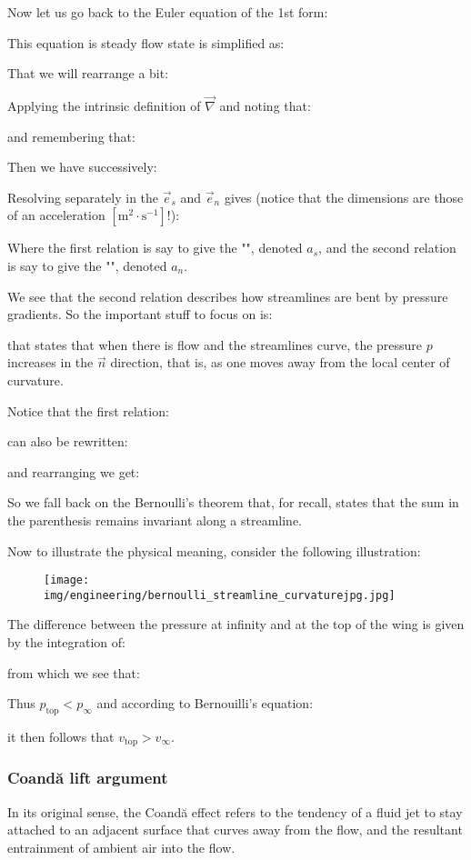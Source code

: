 	Now let us go back to the Euler equation of the 1st form:
	
	This equation is steady flow state is simplified as:
	
	That we will rearrange a bit:
	
	Applying the intrinsic definition of $\vec{\nabla}$ and noting that:
	
	and remembering that:
	
	Then we have successively:
	
	Resolving separately in the $\vec{e}_s$ and $\vec{e}_n$ gives (notice that the dimensions are those of an acceleration $[\text{m}^2\cdot \text{s}^{-1}]$!):
	
	Where the first relation is say to give the "", denoted $a_s$, and the second relation is say to give the "", denoted $a_n$.
	
	We see that the second relation describes how streamlines are bent by pressure gradients. So the important stuff to focus on is:
	
 	that states that when there is flow and the streamlines curve,
the pressure $p$  increases in the $\vec{n}$ direction, that is, as one moves away from the local center of curvature.
	\begin{tcolorbox}[title=Remark,colframe=black,arc=10pt]
	Notice that the first relation:
	
	can also be rewritten:
	
	and rearranging we get:
	
	So we fall back on the Bernoulli's theorem that, for recall, states that the sum in the parenthesis remains invariant along a streamline.
	\end{tcolorbox}
	Now to illustrate the physical meaning, consider the following illustration:
	\begin{figure}[H]
		\centering
		\texttt{[image: img/engineering/bernoulli\_streamline\_curvaturejpg.jpg]}
	\end{figure}
	The difference between the pressure at infinity and at the top
of the wing is given by the integration of:
	
	from which we see that:
	
	Thus $p_\text{top}<p_{\infty}$ and according to Bernouilli's equation:
	
	it then follows that $v_\text{top}>v_{\infty}$.
	
	\subsubsection{Coandă lift argument}
	In its original sense, the Coandă effect refers to the tendency of a fluid jet to stay attached to an adjacent surface that curves away from the flow, and the resultant entrainment of ambient air into the flow.
	
